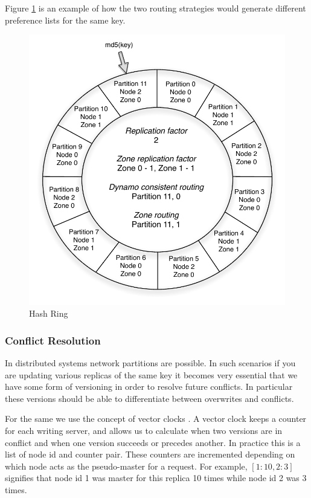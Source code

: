 \documentclass[twocolumn]{article}
\begin{document}
Figure \ref{hash} is an example of how the two routing strategies would generate different preference lists for the same key.  

\begin{figure}
  \centering
    \includegraphics[scale=0.55]{images/hash.pdf}
  \caption{Hash Ring}
  \label{hash}
\end{figure}


\subsubsection {Conflict Resolution } 
\label{sec:system_architecture:system_components:conflict_resolution}

In distributed systems network partitions are possible. In such scenarios if you are updating various replicas of the same key it becomes very essential that we have some form of versioning in order to resolve future conflicts. In particular these versions should be able to differentiate between overwrites and conflicts. 

For the same we use the concept of vector clocks \cite{lamport}. A vector clock keeps a counter for each writing server, and allows us to calculate when two versions are in conflict and when one version succeeds or precedes another. In practice this is a list of node id and counter pair. These counters are incremented depending on which node acts as the pseudo-master for a request. For example,  $[1:10,2:3]$ signifies that node id 1 was master for this replica 10 times while node id 2 was 3 times. 
\end{document}
